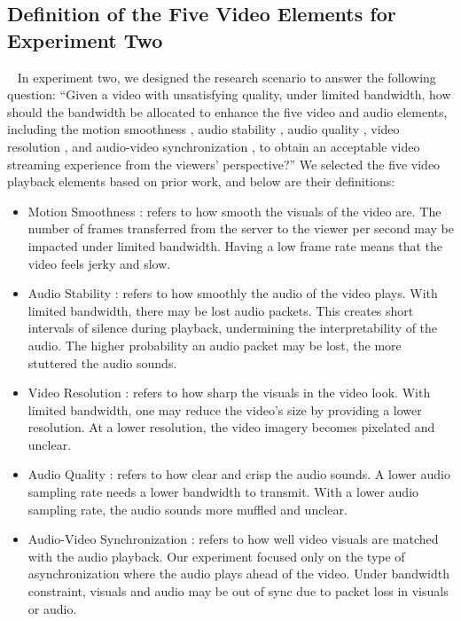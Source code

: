\subsection{Definition of the Five Video Elements for Experiment Two}~\label{elem_def}
In experiment two, we designed the research scenario to answer the following question: ``Given a video with unsatisfying quality, under limited bandwidth, how should the bandwidth be allocated to enhance the five video and audio elements, including the motion smoothness \cite{huynh2008temporal}, audio stability \cite{hardman1998successful}, audio quality \cite{knoche2008low}, video resolution \cite{knoche2005can}, and audio-video synchronization \cite{steinmetz1996human}, to obtain an acceptable video streaming experience from the viewers' perspective?'' We selected the five video playback elements based on prior work, and below are their definitions: 

\begin{itemize}
    \item Motion Smoothness \cite{huynh2008temporal, oeldorf2012bad}: refers to how smooth the visuals of the video are. The number of frames transferred from the server to the viewer per second may be impacted under limited bandwidth. Having a low frame rate means that the video feels jerky and slow.
    \item Audio Stability \cite{hardman1998successful}: refers to how smoothly the audio of the video plays. With limited bandwidth, there may be lost audio packets. This creates short intervals of silence during playback, undermining the interpretability of the audio. The higher probability an audio packet may be lost, the more stuttered the audio sounds.
    \item Video Resolution \cite{oeldorf2012bad, knoche2005can}: refers to how sharp the visuals in the video look. With limited bandwidth, one may reduce the video's size by providing a lower resolution. At a lower resolution, the video imagery becomes pixelated and unclear. 
    \item Audio Quality \cite{oeldorf2012bad, noll1993wideband}: refers to how clear and crisp the audio sounds. A lower audio sampling rate needs a lower bandwidth to transmit. With a lower audio sampling rate, the audio sounds more muffled and unclear.
    \item Audio-Video Synchronization \cite{steinmetz1996human}: refers to how well video visuals are matched with the audio playback. Our experiment focused only on the type of asynchronization where the audio plays ahead of the video. Under bandwidth constraint, visuals and audio may be out of sync due to packet loss in visuals or audio.
\end{itemize}



